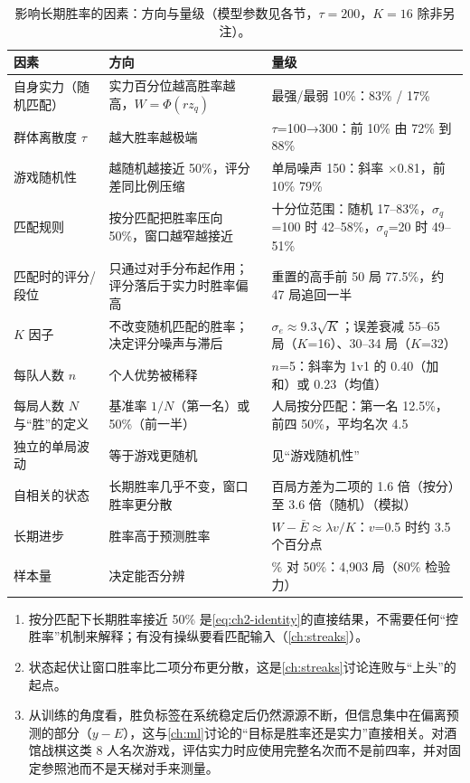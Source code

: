 \begin{table}[!htbp]
  \centering\footnotesize
  \caption{影响长期胜率的因素：方向与量级（模型参数见各节，$\tau=200$，$K=16$ 除非另注）。\tagOwn}
  \label{tab:ch2-summary}
  \renewcommand{\arraystretch}{1.15}
  \begin{tabularx}{\textwidth}{>{\raggedright\arraybackslash}p{2.6cm}>{\raggedright\arraybackslash}X>{\raggedright\arraybackslash}p{5.2cm}}
    \toprule
    因素 & 方向 & 量级\\
    \midrule
    自身实力（随机匹配） & 实力百分位越高胜率越高，$W=\Phi(r z_q)$ & 最强/最弱 10\%：83\% / 17\%\\
    群体离散度 $\tau$ & 越大胜率越极端 & $\tau$=100→300：前 10\% 由 72\% 到 88\%\\
    游戏随机性 & 越随机越接近 50\%，评分差同比例压缩 & 单局噪声 150：斜率 ×0.81，前 10\% 79\%\\
    匹配规则 & 按分匹配把胜率压向 50\%，窗口越窄越接近 & 十分位范围：随机 17–83\%，$\sigma_q$=100 时 42–58\%，$\sigma_q$=20 时 49–51\%\\
    匹配时的评分/段位 & 只通过对手分布起作用；评分落后于实力时胜率偏高 & 重置的高手前 50 局 77.5\%，约 47 局追回一半\\
    $K$ 因子 & 不改变随机匹配的胜率；决定评分噪声与滞后 & $\sigma_e\approx9.3\sqrt K$；误差衰减 55–65 局（$K$=16）、30–34 局（$K$=32）\\
    每队人数 $n$ & 个人优势被稀释 & $n$=5：斜率为 1v1 的 0.40（加和）或 0.23（均值）\\
    每局人数 $N$ 与“胜”的定义 & 基准率 $1/N$（第一名）或 50\%（前一半） & 8 人局按分匹配：第一名 12.5\%，前四 50\%，平均名次 4.5\\
    独立的单局波动 & 等于游戏更随机 & 见“游戏随机性”\\
    自相关的状态 & 长期胜率几乎不变，窗口胜率更分散 & 百局方差为二项的 1.6 倍（按分）至 3.6 倍（随机）（模拟）\\
    长期进步 & 胜率高于预测胜率 & $W-\bar E\approx\lambda v/K$：$v$=0.5 时约 3.5 个百分点\\
    样本量 & 决定能否分辨 & 52\% 对 50\%：4,903 局（80\% 检验力）\\
    \bottomrule
  \end{tabularx}
\end{table}

\begin{keybox}
\begin{enumerate}
\item 按分匹配下长期胜率接近 50\% 是\cref{eq:ch2-identity}的直接结果，不需要任何“控胜率”机制来解释；有没有操纵要看匹配输入（\cref{ch:streaks}）。
\item 状态起伏让窗口胜率比二项分布更分散，这是\cref{ch:streaks}讨论连败与“上头”的起点。
\item 从训练的角度看，胜负标签在系统稳定后仍然源源不断，但信息集中在偏离预测的部分（$y-E$），这与\cref{ch:ml}讨论的“目标是胜率还是实力”直接相关。对酒馆战棋这类 8 人名次游戏，评估实力时应使用完整名次而不是前四率，并对固定参照池而不是天梯对手来测量。
\end{enumerate}
\end{keybox}


